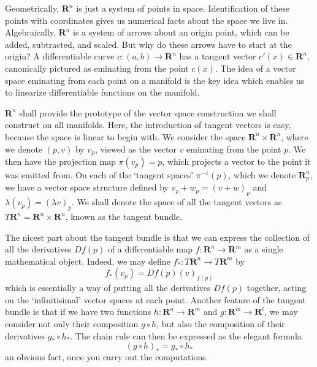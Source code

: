 Geometrically, $\mathbf{R}^n$ is just a system of points in space. Identification of these points with coordinates gives us numerical facts about the space we live in. Algebraically, $\mathbf{R}^n$ is a system of arrows about an origin point, which can be added, subtracted, and scaled. But why do these arrows have to start at the origin? A differentiable curve $c:(a,b) \to \mathbf{R}^n$ has a tangent vector $c'(x) \in \mathbf{R}^n$, canonically pictured as eminating from the point $c(x)$. The idea of a vector space eminating from each point on a manifold is the key idea which enables us to linearize differentiable functions on the manifold.

$\mathbf{R}^n$ shall provide the prototype of the vector space construction we shall construct on all manifolds. Here, the introduction of tangent vectors is easy, because the space is linear to begin with. We consider the space $\mathbf{R}^n \times \mathbf{R}^n$, where we denote $(p,v)$ by $v_p$, viewed as the vector $v$ eminating from the point $p$. We then have the projection map $\pi(v_p) = p$, which projects a vector to the point it was emitted from. On each of the `tangent spaces' $\pi^{-1}(p)$, which we denote $\mathbf{R}^n_p$, we have a vector space structure defined by $v_p + w_p = (v + w)_p$ and $\lambda (v_p) = (\lambda v)_p$. We shall denote the space of all the tangent vectors as $T\mathbf{R}^n = \mathbf{R}^n \times \mathbf{R}^n$, known as the tangent bundle.

The nicest part about the tangent bundle is that we can express the collection of all the derivatives $Df(p)$ of a differentiable map $f: \mathbf{R}^n \to \mathbf{R}^m$ as a single mathematical object. Indeed, we may define $f_*: T\mathbf{R}^n \to T\mathbf{R}^m$ by
%
\[ f_*(v_p) = Df(p)(v)_{f(p)} \]
%
which is essentially a way of putting all the derivatives $Df(p)$ together, acting on the `infinitisimal' vector spaces at each point. Another feature of the tangent bundle is that if we have two functions $h: \mathbf{R}^n \to \mathbf{R}^m$ and $g: \mathbf{R}^m \to \mathbf{R}^l$, we may consider not only their composition $g \circ h$, but also the composition of their derivatives $g_* \circ h_*$. The chain rule can then be expressed as the elegant formula
%
\[ (g \circ h)_* = g_* \circ h_* \]
%
an obvious fact, once you carry out the computations.

